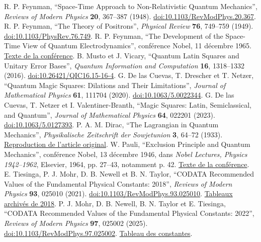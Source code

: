 
{}
 R. P. Feynman, ``Space-Time Approach to Non-Relativistic Quantum Mechanics'', \emph{Reviews of Modern Physics} \textbf{20}, 367--387 (1948). \href{https://doi.org/10.1103/RevModPhys.20.367}{doi:10.1103/RevModPhys.20.367}.
 R. P. Feynman, ``The Theory of Positrons'', \emph{Physical Review} \textbf{76}, 749--759 (1949). \href{https://doi.org/10.1103/PhysRev.76.749}{doi:10.1103/PhysRev.76.749}.
 R. P. Feynman, ``The Development of the Space-Time View of Quantum Electrodynamics'', conférence Nobel, 11 décembre 1965. \href{https://www.nobelprize.org/prizes/physics/1965/feynman/lecture/}{Texte de la conférence}.
 B. Musto et J. Vicary, ``Quantum Latin Squares and Unitary Error Bases'', \emph{Quantum Information and Computation} \textbf{16}, 1318--1332 (2016). \href{https://doi.org/10.26421/QIC16.15-16-4}{doi:10.26421/QIC16.15-16-4}.
 G. De las Cuevas, T. Drescher et T. Netzer, ``Quantum Magic Squares: Dilations and Their Limitations'', \emph{Journal of Mathematical Physics} \textbf{61}, 111704 (2020). \href{https://doi.org/10.1063/5.0022344}{doi:10.1063/5.0022344}.
 G. De las Cuevas, T. Netzer et I. Valentiner-Branth, ``Magic Squares: Latin, Semiclassical, and Quantum'', \emph{Journal of Mathematical Physics} \textbf{64}, 022201 (2023). \href{https://doi.org/10.1063/5.0127393}{doi:10.1063/5.0127393}.
 P. A. M. Dirac, ``The Lagrangian in Quantum Mechanics'', \emph{Physikalische Zeitschrift der Sowjetunion} \textbf{3}, 64--72 (1933). \href{https://www.informationphilosopher.com/solutions/scientists/dirac/Lagrangian_1933.pdf}{Reproduction de l'article original}.
 W. Pauli, ``Exclusion Principle and Quantum Mechanics'', conférence Nobel, 13 décembre 1946, dans \emph{Nobel Lectures, Physics 1942--1962}, Elsevier, 1964, pp. 27--43, notamment p. 42. \href{https://www.nobelprize.org/uploads/2018/06/pauli-lecture.pdf}{Texte de la conférence}.
 E. Tiesinga, P. J. Mohr, D. B. Newell et B. N. Taylor, ``CODATA Recommended Values of the Fundamental Physical Constants: 2018'', \emph{Reviews of Modern Physics} \textbf{93}, 025010 (2021). \href{https://doi.org/10.1103/RevModPhys.93.025010}{doi:10.1103/RevModPhys.93.025010}. \href{https://physics.nist.gov/cuu/Constants/ArchiveASCII/allascii_2018.txt}{Tableaux archivés de 2018}.
 P. J. Mohr, D. B. Newell, B. N. Taylor et E. Tiesinga, ``CODATA Recommended Values of the Fundamental Physical Constants: 2022'', \emph{Reviews of Modern Physics} \textbf{97}, 025002 (2025). \href{https://doi.org/10.1103/RevModPhys.97.025002}{doi:10.1103/RevModPhys.97.025002}. \href{https://physics.nist.gov/cuu/Constants/Table/allascii.txt}{Tableau des constantes}.
